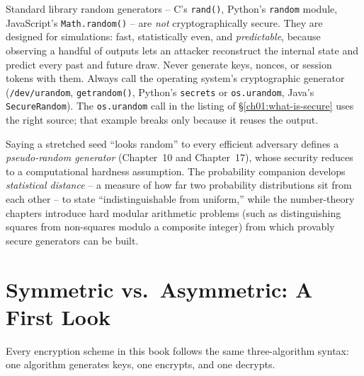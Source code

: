 \begin{trapbox}
Standard library random generators -- C's \texttt{rand()}, Python's \texttt{random} module, JavaScript's \texttt{Math.random()} -- are \emph{not} cryptographically secure. They are designed for simulations: fast, statistically even, and \emph{predictable}, because observing a handful of outputs lets an attacker reconstruct the internal state and predict every past and future draw. Never generate keys, nonces, or session tokens with them. Always call the operating system's cryptographic generator (\texttt{/dev/urandom}, \texttt{getrandom()}, Python's \texttt{secrets} or \texttt{os.urandom}, Java's \texttt{SecureRandom}). The \texttt{os.urandom} call in the listing of \S\ref{ch01:what-is-secure} uses the right source; that example breaks only because it reuses the output.
\end{trapbox}

\begin{connectionbox}
Saying a stretched seed ``looks random'' to every efficient adversary defines a \emph{pseudo-random generator} (Chapter~10 and Chapter~17), whose security reduces to a computational hardness assumption. The probability companion develops \emph{statistical distance} -- a measure of how far two probability distributions sit from each other -- to state ``indistinguishable from uniform,'' while the number-theory chapters introduce hard modular arithmetic problems (such as distinguishing squares from non-squares modulo a composite integer) from which provably secure generators can be built.
\end{connectionbox}

\section{Symmetric vs.\ Asymmetric: A First Look}
\label{ch01:sym-vs-asym}

Every encryption scheme in this book follows the same three-algorithm syntax: one algorithm generates keys, one encrypts, and one decrypts.

